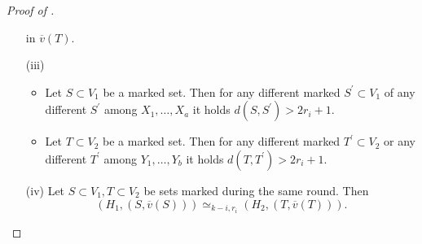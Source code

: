 \documentclass[12pt,notitlepage,a4paper]{article}
\theoremstyle{definition}
\begin{document}
\begin{proof}[Proof of ]
\begin{itemize}
		in $\overline{v}(T)$.
		\item[(iii)] 
			\begin{itemize}
			\item  Let $S\subset V_1$ be a marked set. Then 
			for any different marked $S^\prime \subset V_1$ 
			of any different $S^\prime$ among $X_1,\dots,X_a$
			it holds $d(S,S^\prime)>2r_i + 1$. 
			\item Let $T\subset V_2$ be a marked set. Then
			for any different marked $T^\prime \subset V_2$
			or any different $T^\prime$ among
			$Y_1,\dots, Y_b$  it holds $d(T,T^\prime)>2r_i +1$.
			\end{itemize}
		\item[(iv)] Let $S\subset V_1, T\subset V_2$ be sets
		marked during the same round. Then
		\[
		\left(H_1, (S,\overline{v}(S))\right)\simeq_{k-i,r_i}
		\left(H_2, (T,\overline{v}(T))\right).	\]
					

\end{itemize}
\end{proof}
\end{document}
